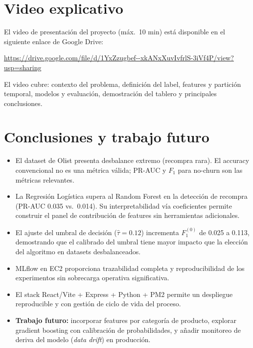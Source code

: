\documentclass[11pt]{article}
\begin{document}
\section{Video explicativo}

El video de presentación del proyecto (máx.\ 10 min) está disponible en el
siguiente enlace de Google Drive:

\begin{center}
  \url{https://drive.google.com/file/d/1YxZzugbef--xkANxXuvIvfrlS-3iVf4P/view?usp=sharing}
\end{center}

El video cubre: contexto del problema, definición del label, features y
partición temporal, modelos y evaluación, demostración del tablero y
principales conclusiones.

\section{Conclusiones y trabajo futuro}

\begin{itemize}[itemsep=2pt, topsep=2pt]
  \item El dataset de Olist presenta desbalance extremo (recompra rara). El
        accuracy convencional no es una métrica válida; PR-AUC y $F_1$ para
        no-churn son las métricas relevantes.
  \item La Regresión Logística supera al Random Forest en la detección de
        recompra (PR-AUC 0.035 vs.\ 0.014). Su interpretabilidad vía coeficientes
        permite construir el panel de contribución de features sin herramientas
        adicionales.
  \item El ajuste del umbral de decisión ($\hat\tau=0.12$) incrementa
        $F_1^{(0)}$ de 0.025 a 0.113, demostrando que el calibrado del umbral
        tiene mayor impacto que la elección del algoritmo en datasets desbalanceados.
  \item MLflow en EC2 proporciona trazabilidad completa y reproducibilidad de
        los experimentos sin sobrecarga operativa significativa.
  \item El stack React/Vite + Express + Python + PM2 permite un despliegue
        reproducible y con gestión de ciclo de vida del proceso.
  \item \textbf{Trabajo futuro:} incorporar features por categoría de producto,
        explorar gradient boosting con calibración de probabilidades, y añadir
        monitoreo de deriva del modelo (\textit{data drift}) en producción.
\end{itemize}
\end{document}
